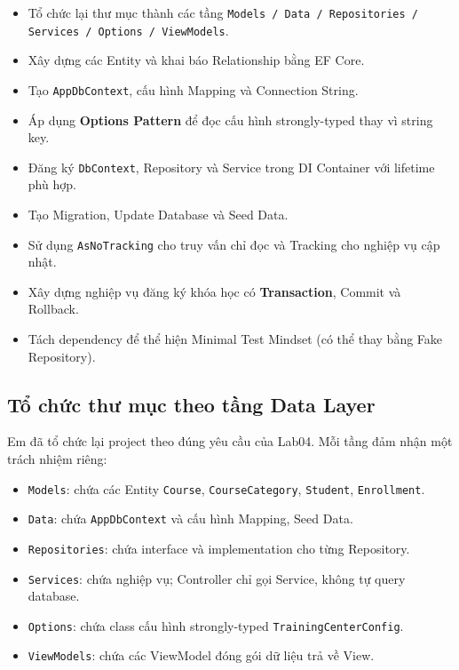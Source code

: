 \begin{itemize}[leftmargin = 0.6cm, label = -]
    \item Tổ chức lại thư mục thành các tầng \texttt{Models / Data / Repositories / Services / Options / ViewModels}.
    \item Xây dựng các Entity và khai báo Relationship bằng EF Core.
    \item Tạo \texttt{AppDbContext}, cấu hình Mapping và Connection String.
    \item Áp dụng \textbf{Options Pattern} để đọc cấu hình strongly-typed thay vì string key.
    \item Đăng ký \texttt{DbContext}, Repository và Service trong DI Container với lifetime phù hợp.
    \item Tạo Migration, Update Database và Seed Data.
    \item Sử dụng \texttt{AsNoTracking} cho truy vấn chỉ đọc và Tracking cho nghiệp vụ cập nhật.
    \item Xây dựng nghiệp vụ đăng ký khóa học có \textbf{Transaction}, Commit và Rollback.
    \item Tách dependency để thể hiện Minimal Test Mindset (có thể thay bằng Fake Repository).
\end{itemize}

\subsection{Tổ chức thư mục theo tầng Data Layer}

Em đã tổ chức lại project theo đúng yêu cầu của Lab04. Mỗi tầng đảm nhận một trách nhiệm riêng:

\begin{itemize}[leftmargin = 0.6cm, label = -]
    \item \texttt{Models}: chứa các Entity \texttt{Course}, \texttt{CourseCategory}, \texttt{Student}, \texttt{Enrollment}.
    \item \texttt{Data}: chứa \texttt{AppDbContext} và cấu hình Mapping, Seed Data.
    \item \texttt{Repositories}: chứa interface và implementation cho từng Repository.
    \item \texttt{Services}: chứa nghiệp vụ; Controller chỉ gọi Service, không tự query database.
    \item \texttt{Options}: chứa class cấu hình strongly-typed \texttt{TrainingCenterConfig}.
    \item \texttt{ViewModels}: chứa các ViewModel đóng gói dữ liệu trả về View.
\end{itemize}

